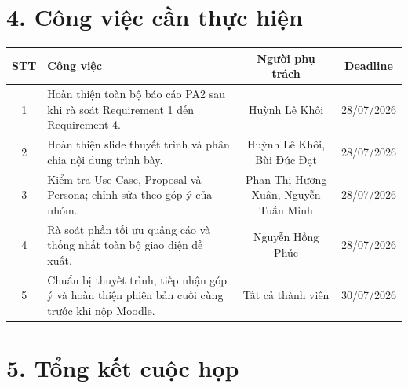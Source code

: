 \documentclass[11pt,a4paper]{article}
\begin{document}
\section*{4. Công việc cần thực hiện}

\begin{tabularx}{\textwidth}{|c|X|c|c|}
\hline
\rowcolor{gray!20}
\textbf{STT} &
\textbf{Công việc} &
\textbf{Người phụ trách} &
\textbf{Deadline}\\
\hline

1 &
Hoàn thiện toàn bộ báo cáo PA2 sau khi rà soát Requirement 1 đến Requirement 4. &
Huỳnh Lê Khôi &
28/07/2026\\
\hline

2 &
Hoàn thiện slide thuyết trình và phân chia nội dung trình bày. &
Huỳnh Lê Khôi, Bùi Đức Đạt &
28/07/2026\\
\hline

3 &
Kiểm tra Use Case, Proposal và Persona; chỉnh sửa theo góp ý của nhóm. &
Phan Thị Hương Xuân, Nguyễn Tuấn Minh &
28/07/2026\\
\hline

4 &
Rà soát phần tối ưu quảng cáo và thống nhất toàn bộ giao diện đề xuất. &
Nguyễn Hồng Phúc &
28/07/2026\\
\hline

5 &
Chuẩn bị thuyết trình, tiếp nhận góp ý và hoàn thiện phiên bản cuối cùng trước khi nộp Moodle. &
Tất cả thành viên &
30/07/2026\\
\hline

\end{tabularx}

\vspace{0.8cm}


\section*{5. Tổng kết cuộc họp}
\end{document}
